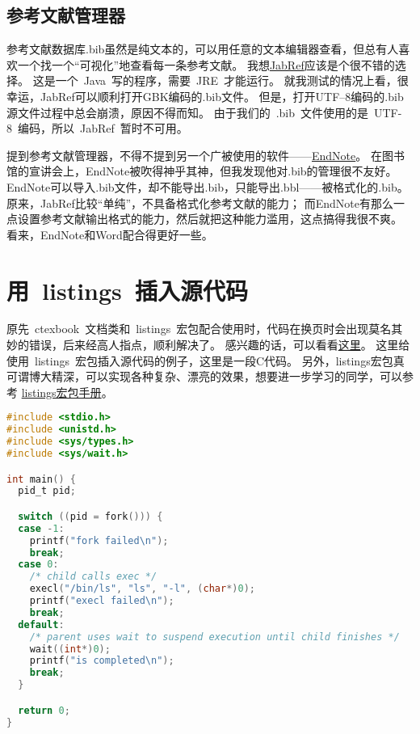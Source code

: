 \subsection{参考文献管理器}

参考文献数据库.bib虽然是纯文本的，可以用任意的文本编辑器查看，但总有人喜欢一个找一个``可视化''地查看每一条参考文献。
我想\href{http://jabref.sourceforge.net/}{JabRef}应该是个很不错的选择。
这是一个~Java~写的程序，需要~JRE~才能运行。
就我测试的情况上看，很幸运，JabRef可以顺利打开GBK编码的.bib文件。
但是，打开UTF--8编码的.bib源文件过程中总会崩溃，原因不得而知。
由于我们的~.bib~文件使用的是~UTF-8~编码，所以~JabRef~暂时不可用。

提到参考文献管理器，不得不提到另一个广被使用的软件——\href{http://www.endnote.com/}{EndNote}。
在图书馆的宣讲会上，EndNote被吹得神乎其神，但我发现他对.bib的管理很不友好。
EndNote可以导入.bib文件，却不能导出.bib，只能导出.bbl——被格式化的.bib。
原来，JabRef比较``单纯''，不具备格式化参考文献的能力；
而EndNote有那么一点设置参考文献输出格式的能力，然后就把这种能力滥用，这点搞得我很不爽。
看来，EndNote和Word配合得更好一些。


\section{用~listings~插入源代码}

原先~ctexbook~文档类和~listings~宏包配合使用时，代码在换页时会出现莫名其妙的错误，后来经高人指点，顺利解决了。
感兴趣的话，可以看看\href{http://bbs.ctex.org/viewthread.php?tid=53451}{这里}。
这里给使用~listings~宏包插入源代码的例子，这里是一段C代码。
另外，listings宏包真可谓博大精深，可以实现各种复杂、漂亮的效果，想要进一步学习的同学，可以参考
\href{http://mirror.ctan.org/macros/latex/contrib/listings/listings.pdf}{listings宏包手册}。

\begin{lstlisting}[language={C}, caption={一段C源代码}]
#include <stdio.h>
#include <unistd.h>
#include <sys/types.h>
#include <sys/wait.h>

int main() {
  pid_t pid;

  switch ((pid = fork())) {
  case -1:
    printf("fork failed\n");
    break;
  case 0:
    /* child calls exec */
    execl("/bin/ls", "ls", "-l", (char*)0);
    printf("execl failed\n");
    break;
  default:
    /* parent uses wait to suspend execution until child finishes */
    wait((int*)0);
    printf("is completed\n");
    break;
  }

  return 0;
}
\end{lstlisting}

